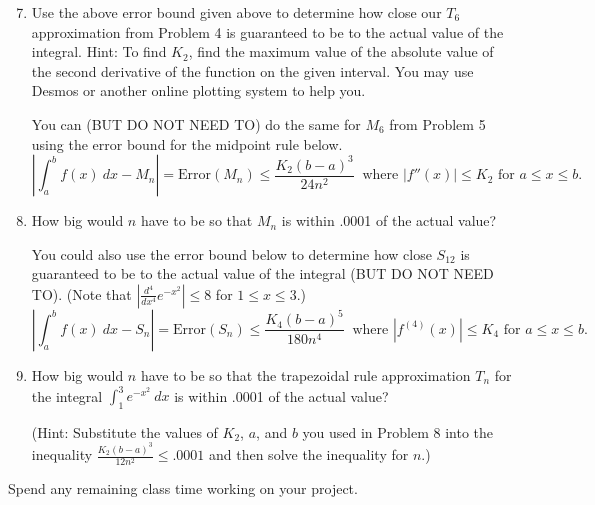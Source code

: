 \documentclass[12pt]{article}
\begin{document}
\begin{enumerate}
\setcounter{enumi}{6}
\item Use the above error bound given above to determine how close our $T_6$ approximation from Problem 4 is guaranteed to be to the actual value of the integral. Hint: To find $K_2$, find the maximum value of the absolute value of the second derivative of the function on the given interval. You may use Desmos or another online plotting system to help you.



\medskip




You can (BUT DO NOT NEED TO) do the same for $M_6$ from Problem 5 using the error bound for the midpoint rule below.
\[\left|\int_a^b f(x) \ dx - M_n\right| = \mbox{Error}(M_n)\leq \frac{K_2 (b-a)^3}{24 n^2} \ \mbox{   where } |f''(x)|\leq K_2 \mbox{ for } a\leq x\leq b.\]

\medskip
\pagebreak
\item How big would $n$ have to be so that $M_n$ is within .0001 of the actual value?

\bigskip

\bigskip

You could also use  the error bound below to determine how close $S_{12}$  is guaranteed to be to the actual value of the integral (BUT DO NOT NEED TO). (Note that $|\frac{d^4}{dx^4} e^{-x^2}|\leq 8$ for $1\leq x\leq 3$.)
\[\left|\int_a^b f(x) \ dx - S_n\right| = \mbox{Error}(S_n)\leq \frac{K_4 (b-a)^5}{180 n^4} \ \mbox{   where } |f^{(4)}(x)|\leq K_4 \mbox{ for } a\leq x\leq b.\]

\vfill


\item How big would $n$ have to be so that the trapezoidal rule approximation $T_n$ for the integral $\int_1^3 e^{-x^2} \ dx$ is within .0001 of the actual value? 

(Hint: Substitute the values of $K_2$, $a$, and $b$ you used in Problem 8 into the inequality $\frac{K_2 (b-a)^3}{12 n^2}\leq .0001$ and then solve the inequality for $n$.) 

\vfill

\end{enumerate} 

Spend any remaining class time working on your project.
\end{document}
